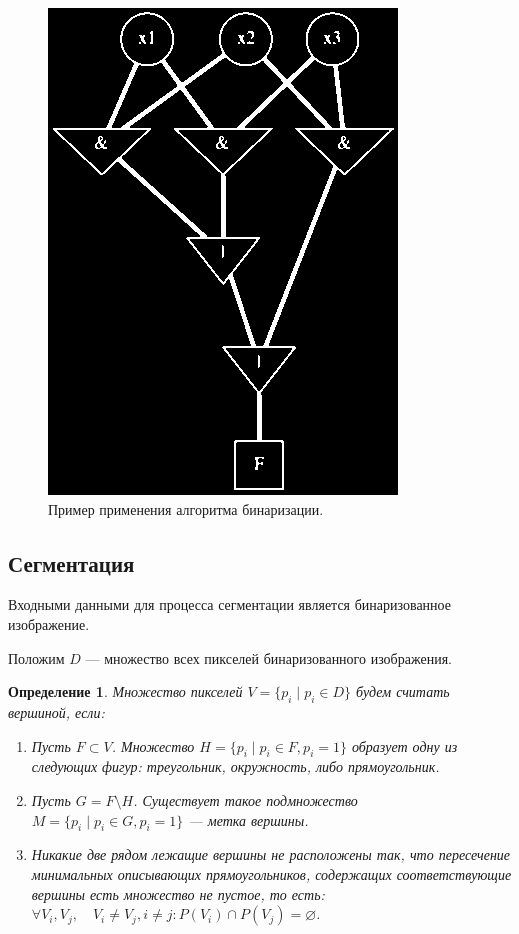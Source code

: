 \documentclass[makeidx, a4paper, 14pt]{extarticle}
\newtheorem{definition}{Определение}
\begin{document}
\begin{figure}[H]
    \centering
    \includegraphics[scale=0.75]{img4_binary.png}
    \caption{Пример применения алгоритма бинаризации.}
\end{figure}

\subsection{Сегментация}

Входными данными для процесса сегментации является бинаризованное изображение.

Положим $D$ --- множество всех пикселей бинаризованного изображения.

\begin{definition}
    Множество пикселей ${V = \{p_i \mid p_i \in D\}}$ будем считать вершиной, если:
    \begin{enumerate}
        \item Пусть ${F \subset V}$. Множество ${H = \{p_i \mid p_i \in F, p_i=1\}}$ образует одну из следующих фигур: треугольник, окружность, либо прямоугольник.
        \item Пусть ${G = F \setminus H}$. Существует такое подмножество \\
              ${M=\{p_i \mid p_i \in G, p_i=1\}}$ --- метка вершины.
        \item Никакие две рядом лежащие вершины не расположены так,
              что пересечение минимальных описывающих прямоугольников,
              содержащих соответствующие вершины есть множество не пустое, то есть: \\
              ${\forall V_i, V_j, \quad V_i \neq V_j, i \neq j: P(V_i) \cap P(V_j) = \varnothing}$.
    \end{enumerate}
\end{definition}
\end{document}
